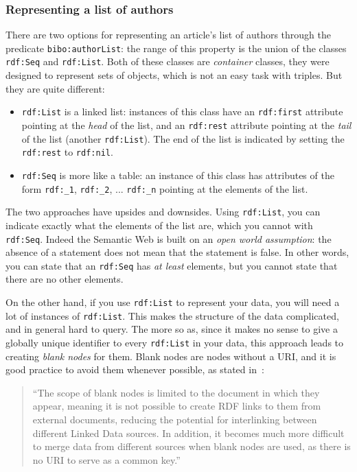 \documentclass[a4paper,11pt]{report}
\begin{document}
\subsubsection*{Representing a list of authors}
There are two options for representing an article's list of authors through the predicate \texttt{bibo:authorList}: the range of this property is the union of the classes  \texttt{rdf:Seq} and  \texttt{rdf:List}. Both of these classes are \emph{container} classes, they were designed to represent sets of objects, which is not an easy task with triples. But they are quite different:
\begin{itemize}
\item \texttt{rdf:List} is a linked list: instances of this class have an \texttt{rdf:first} attribute pointing at the \emph{head} of the list, and an \texttt{rdf:rest} attribute pointing at the \emph{tail} of the list (another \texttt{rdf:List}). The end of the list is indicated by setting the \texttt{rdf:rest} to \texttt{rdf:nil}. 
\item \texttt{rdf:Seq} is more like a table: an instance of this class has attributes of the form \texttt{rdf:{\_}1}, \texttt{rdf:{\_}2}, ... \texttt{rdf:{\_}n} pointing at the elements of the list. 
\end{itemize}

The two approaches have upsides and downsides. Using \texttt{rdf:List}, you can indicate exactly what the elements of the list are, which you cannot with \texttt{rdf:Seq}. Indeed the Semantic Web is built on an \emph{open world assumption}: the absence of a statement does not mean that the statement is false. In other words, you can state that an \texttt{rdf:Seq} has \emph{at least} elements, but you cannot state that there are no other elements. 

On the other hand, if you use \texttt{rdf:List} to represent your data, you will need a lot of instances of \texttt{rdf:List}. This makes the structure of the data complicated, and in general hard to query. The more so as, since it makes no sense to give a globally unique identifier to every \texttt{rdf:List} in your data, this approach leads to creating \emph{blank nodes} for them. Blank nodes are nodes without a URI, and it is good practice to avoid them whenever possible, as stated in~\cite{Heath2011}:
\begin{quotation}
``The scope of blank nodes is limited to the document in which they appear, meaning it is not possible to create RDF links to them from external documents, reducing the potential for interlinking between different Linked Data sources. In addition, it becomes much more difficult to merge data from different sources when blank nodes are used, as there is no URI to serve as a common key.''
\end{quotation}
\end{document}
